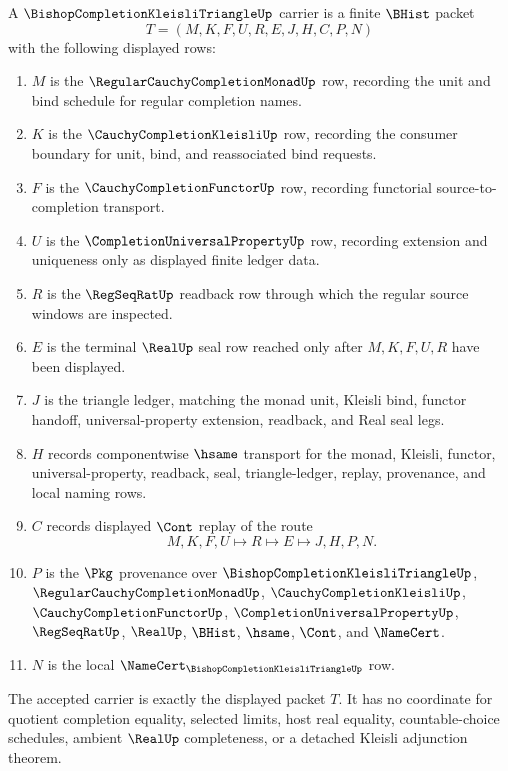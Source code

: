 \begin{definition}
\label{def:bishop-completion-kleisli-triangle-carrier}
A $\BishopCompletionKleisliTriangleUp$ carrier is a finite $\BHist$ packet
$$
T=(M,K,F,U,R,E,J,H,C,P,N)
$$
with the following displayed rows:
\begin{enumerate}
\item $M$ is the $\RegularCauchyCompletionMonadUp$ row, recording the unit and bind schedule for regular completion names.
\item $K$ is the $\CauchyCompletionKleisliUp$ row, recording the consumer boundary for unit, bind, and reassociated bind requests.
\item $F$ is the $\CauchyCompletionFunctorUp$ row, recording functorial source-to-completion transport.
\item $U$ is the $\CompletionUniversalPropertyUp$ row, recording extension and uniqueness only as displayed finite ledger data.
\item $R$ is the $\RegSeqRatUp$ readback row through which the regular source windows are inspected.
\item $E$ is the terminal $\RealUp$ seal row reached only after $M,K,F,U,R$ have been displayed.
\item $J$ is the triangle ledger, matching the monad unit, Kleisli bind, functor handoff, universal-property extension, readback, and Real seal legs.
\item $H$ records componentwise $\hsame$ transport for the monad, Kleisli, functor, universal-property, readback, seal, triangle-ledger, replay, provenance, and local naming rows.
\item $C$ records displayed $\Cont$ replay of the route
$$
M,K,F,U \longmapsto R \longmapsto E \longmapsto J,H,P,N .
$$
\item $P$ is the $\Pkg$ provenance over $\BishopCompletionKleisliTriangleUp$, $\RegularCauchyCompletionMonadUp$, $\CauchyCompletionKleisliUp$, $\CauchyCompletionFunctorUp$, $\CompletionUniversalPropertyUp$, $\RegSeqRatUp$, $\RealUp$, $\BHist$, $\hsame$, $\Cont$, and $\NameCert$.
\item $N$ is the local $\NameCert_{\BishopCompletionKleisliTriangleUp}$ row.
\end{enumerate}
The accepted carrier is exactly the displayed packet $T$. It has no coordinate for quotient completion equality, selected limits, host real equality, countable-choice schedules, ambient $\RealUp$ completeness, or a detached Kleisli adjunction theorem.
\end{definition}

